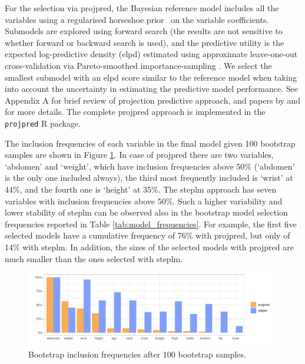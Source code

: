 \documentclass[a4]{article}
\theoremstyle{definition}
\begin{document}
For the selection via projpred, the Bayesian reference model includes
all the variables using a regularised horseshoe prior~\citep{paper:rhs} on the
variable coefficients. Submodels are explored using
forward search (the results are not sensitive to whether forward or
backward search is used), and the predictive utility is the expected
log-predictive density (elpd) estimated using approximate leave-one-out cross-validation via Pareto-smoothed importance-sampling
\citep[PSIS-LOO-CV; ][]{paper:psis_loo}.  We select the smallest  submodel with an elpd score similar to the reference model
when taking into account the uncertainty in estimating the predictive
model performance. See Appendix A for brief review of projection
predictive approach, and papers by \citet{paper:model_selection} and
\citet{paper:projpred} for more details. The complete projpred approach is implemented in the \texttt{projpred} R package.

The inclusion frequencies of each variable in the final model given 100
bootstrap samples are shown in Figure
\ref{fig:inclusion_frequencies}. In case of projpred there are two
variables, `abdomen' and `weight', which have inclusion frequencies
above 50\% (`abdomen' is the only one included always), the third most
frequently included is `wrist' at 44\%, and the fourth one is `height'
at 35\%.  The steplm approach has seven variables with inclusion
frequencies above 50\%. Such a higher variability and lower stability
of steplm can be observed also in the bootstrap model selection
frequencies reported in Table \ref{tab:model_frequencies}. For
example, the first five selected models have a cumulative frequency of
76\% with projpred, but only of 14\% with steplm. In addition, the
sizes of the selected models with projpred are much smaller than the ones 
selected with steplm.
\begin{figure}[tp]
  \centering
  \includegraphics[width=0.98\textwidth]{graphics/inc_prob.pdf}
  \caption{Bootstrap inclusion frequencies after 100 bootstrap samples.}
  \label{fig:inclusion_frequencies}
\end{figure}
\end{document}
